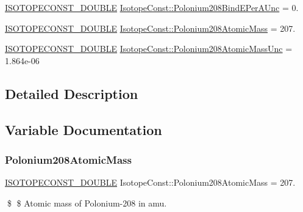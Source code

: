 \begin{DoxyCompactItemize}
\mbox{\hyperlink{group___isotope_const-_macros_ga8f45a7272ce02c0b4c65c44636ed719a}{I\+S\+O\+T\+O\+P\+E\+C\+O\+N\+S\+T\+\_\+\+D\+O\+U\+B\+LE}} \mbox{\hyperlink{group___isotope_const-_polonium-_po208_ga82e5998d05b1b47b21182eeb2b2ef7ab}{Isotope\+Const\+::\+Polonium208\+Bind\+E\+Per\+A\+Unc}} = 0.
\item 
\mbox{\hyperlink{group___isotope_const-_macros_ga8f45a7272ce02c0b4c65c44636ed719a}{I\+S\+O\+T\+O\+P\+E\+C\+O\+N\+S\+T\+\_\+\+D\+O\+U\+B\+LE}} \mbox{\hyperlink{group___isotope_const-_polonium-_po208_ga11fe3ab2bddcb74eca81653531ae9001}{Isotope\+Const\+::\+Polonium208\+Atomic\+Mass}} = 207.
\item 
\mbox{\hyperlink{group___isotope_const-_macros_ga8f45a7272ce02c0b4c65c44636ed719a}{I\+S\+O\+T\+O\+P\+E\+C\+O\+N\+S\+T\+\_\+\+D\+O\+U\+B\+LE}} \mbox{\hyperlink{group___isotope_const-_polonium-_po208_ga14b214b964a1e15e6bbf9e2e97d20dfe}{Isotope\+Const\+::\+Polonium208\+Atomic\+Mass\+Unc}} = 1.\+864e-\/06
\end{DoxyCompactItemize}


\subsection{Detailed Description}


\subsection{Variable Documentation}
\mbox{\label{group___isotope_const-_polonium-_po208_ga11fe3ab2bddcb74eca81653531ae9001}} 
\subsubsection{\texorpdfstring{Polonium208\+Atomic\+Mass}{Polonium208AtomicMass}}
{\footnotesize\ttfamily \mbox{\hyperlink{group___isotope_const-_macros_ga8f45a7272ce02c0b4c65c44636ed719a}{I\+S\+O\+T\+O\+P\+E\+C\+O\+N\+S\+T\+\_\+\+D\+O\+U\+B\+LE}} Isotope\+Const\+::\+Polonium208\+Atomic\+Mass = 207.}

\$ \$ Atomic mass of Polonium-\/208 in amu. \mbox{\label{group___isotope_const-_polonium-_po208_ga14b214b964a1e15e6bbf9e2e97d20dfe}} 
